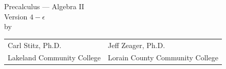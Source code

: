 \allsectionsfont{\mdseries \scshape}
\makeatletter
\renewcommand\l@section{\@dottedtocline{1}{1.5em}{3em}}
\renewcommand\l@subsection{\@dottedtocline{2}{4.5em}{3.5em}}
\makeatother
\pagestyle{fancy}

\renewcommand{\textinterrobang}{$! \! \! ?$}


\usepackage[scaled=.92]{helvet}   
\renewcommand{\familydefault}{\sfdefault}  %
\usepackage[helvet]{sfmath}  %
\allsectionsfont{\sffamily}  %

\makeatletter
{}
\makeatother

\makeindex



\renewcommand{\chaptermark}[1]%
                  {\markboth{#1}{}}
\renewcommand{\sectionmark}[1]%
               {\markright{\thesection\ #1}}
\renewcommand{\headrulewidth}{0pt}
\lhead[\fancyplain{}{\thepage}]%
      {\fancyplain{}{\nouppercase{\rightmark}}}
\rhead[\fancyplain{}{\nouppercase{\leftmark}}]%
      {\fancyplain{}{\thepage}}
\cfoot{}

\mgeometry

\frontmatter



\begin{titlepage}
\begin{center}

\vspace*{0.1\paperheight}

\Huge Precalculus --- Algebra II  \\ \vspace{.1in} \large Version $4 - \epsilon$  \\ \vspace{.25in} \large by

\vspace{0.1\paperheight}

\begin{tabularx}{0.953\linewidth}{YY} Carl Stitz, Ph.D. &  Jeff Zeager, Ph.D. \\ Lakeland Community College & Lorain County Community College \\\end{tabularx}

\vfill

\begin{center}
    \sophia
\end{center}

\end{center}
\end{titlepage}

